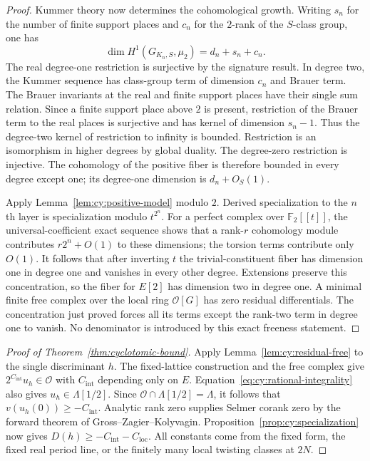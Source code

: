 \begin{proof}
Kummer theory now determines the cohomological growth.
Writing $s_n$ for the number of finite support places and $c_n$ for the
$2$-rank of the $S$-class group, one has
\[
 \dim H^1(G_{K_n,S},\mu_2)=d_n+s_n+c_n.
\]
The real degree-one restriction is surjective by the signature result.
In degree two, the Kummer sequence has class-group term of dimension
$c_n$ and Brauer term.  The Brauer invariants at the real and finite
support places have their single sum relation.  Since a finite support
place above $2$ is present, restriction of the Brauer term to the real
places is surjective and has kernel of dimension $s_n-1$.  Thus the
degree-two kernel of restriction to infinity is bounded.  Restriction
is an isomorphism in higher degrees by global duality.  The degree-zero
restriction is injective.  The cohomology of the positive fiber is
therefore bounded in every degree except one; its degree-one dimension
is $d_n+O_S(1)$.

Apply Lemma~\ref{lem:cy:positive-model} modulo $2$.  Derived specialization to the
$n$th layer is specialization modulo $t^{2^n}$.  For a perfect complex
over $\mathbb F _2[[t]]$, the universal-coefficient exact sequence shows
that a rank-$r$ cohomology module contributes $r2^n+O(1)$ to these
dimensions; the torsion terms contribute only $O(1)$.  It follows that
after inverting $t$ the trivial-constituent fiber has dimension one in
degree one and vanishes in every other degree.  Extensions preserve
this concentration, so the fiber for $E[2]$ has dimension two in degree
one.  A minimal finite free complex over the local ring $\mathcal O[G]$
has zero residual differentials.  The concentration just proved forces
all its terms except the rank-two term in degree one to vanish.
No denominator is introduced by this exact freeness statement.
\end{proof}

\begin{proof}[Proof of Theorem~\ref{thm:cyclotomic-bound}]
Apply Lemma~\ref{lem:cy:residual-free} to the single discriminant $h$.
The fixed-lattice construction and the free complex give
$2^{C_{\mathrm{int}}}u_h\in\mathcal O$ with $C_{\mathrm{int}}$ depending
only on $E$. Equation~\eqref{eq:cy:rational-integrality} also gives
$u_h\in\Lambda[1/2]$. Since
$\mathcal O\cap\Lambda[1/2]=\Lambda$, it follows that
$v(u_h(0))\ge-C_{\mathrm{int}}$. Analytic rank zero supplies Selmer
corank zero by the forward theorem of Gross--Zagier--Kolyvagin.
Proposition~\ref{prop:cy:specialization} now gives
$D(h)\ge-C_{\mathrm{int}}-C_{\mathrm{loc}}$.
All constants come from the fixed form, the fixed real period line,
or the finitely many local twisting classes at $2N$.
\end{proof}

